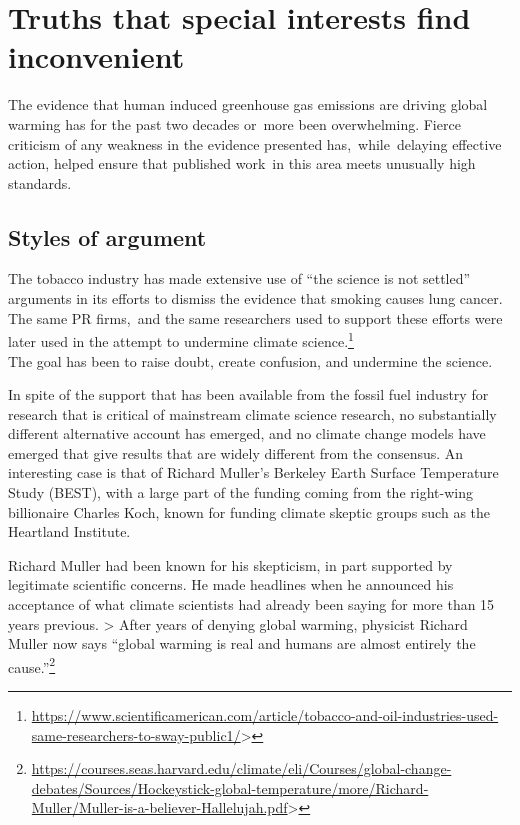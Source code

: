 \documentclass[
  10pt,
  b5paper]{book}
\begin{document}
\hypertarget{truths-that-special-interests-find-inconvenient}{%
\section{Truths that special interests find inconvenient}\label{truths-that-special-interests-find-inconvenient}}

The evidence that human induced greenhouse gas emissions
are driving global warming has for the past two decades
or~more been overwhelming. Fierce criticism of any weakness
in the evidence presented has,~while~delaying effective
action, helped ensure that published work~in this area meets
unusually high standards.

\hypertarget{styles-of-argument}{%
\subsection*{Styles of argument}\label{styles-of-argument}}

The tobacco industry has made extensive use of ``the science is not settled''
arguments in its efforts to dismiss the evidence that smoking causes lung cancer.
The same PR firms,~and the same researchers used to support these efforts
were later used in the attempt to undermine climate science.\footnote{\url{https://www.scientificamerican.com/article/tobacco-and-oil-industries-used-same-researchers-to-sway-public1/}\textgreater{}}\\
The goal has been to raise doubt, create confusion, and undermine the
science.

In spite of the support that has been available from the fossil fuel
industry for research that is critical of mainstream climate science
research, no substantially different alternative account has emerged,
and no climate change models have emerged that give results that are
widely different from the consensus. An interesting case is that of
Richard Muller's Berkeley Earth Surface Temperature Study (BEST),
with a large part of the funding coming from the right-wing billionaire
Charles Koch, known for funding climate skeptic groups such as the
Heartland Institute.

Richard Muller had been known for his skepticism, in part supported
by legitimate scientific concerns. He made headlines when he announced
his acceptance of what climate scientists had already been saying
for more than 15 years previous.
\textgreater{} After years of denying global warming, physicist Richard Muller now says ``global warming is real and humans are almost entirely the cause.''\footnote{\url{https://courses.seas.harvard.edu/climate/eli/Courses/global-change-debates/Sources/Hockeystick-global-temperature/more/Richard-Muller/Muller-is-a-believer-Hallelujah.pdf}\textgreater{}}
\end{document}
